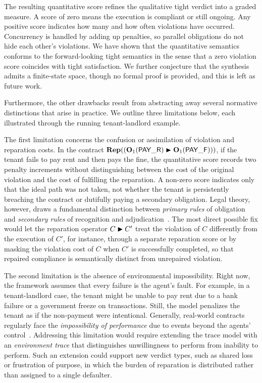 The resulting quantitative score refines the qualitative tight verdict into a graded measure.
A score of zero means the execution is compliant or still ongoing. Any positive score indicates how many and how often violations have occurred.
Concurrency is handled by adding up penalties, so parallel obligations do not hide each other's violations.
We have shown that the quantitative semantics conforms to the forward-looking tight semantics in the sense that a zero violation score coincides with tight satisfaction. We further conjecture that the synthesis admits a finite-state space, though no formal proof is provided, and this is left as future work. 

Furthermore, the other drawbacks result from abstracting away several normative distinctions that arise in practice.
We outline three limitations below, each illustrated through the running tenant-landlord example.

The first limitation concerns the confusion or assimilation of violation and reparation costs.
In the contract $\repit{(\obl[1]{\PAY} \repair \obl[1]{\PAYF})}$, if the tenant fails to pay rent and then pays the fine, the quantitative score records two penalty increments without distinguishing between the cost of the original violation and the cost of fulfilling the reparation.
A non-zero score indicates only that the ideal path was not taken, not whether the tenant is persistently breaching the contract or dutifully paying a secondary obligation.
Legal theory, however, draws a fundamental distinction between \emph{primary rules} of obligation and \emph{secondary rules} of recognition and adjudication~\cite{Hart1961}. The most direct possible fix would let the reparation operator $C \repair C'$ treat the violation of $C$ differently from the execution of $C'$, for instance, through a separate reparation score or by masking the violation cost of $C$ when $C'$ is successfully completed, so that repaired compliance is semantically distinct from unrepaired violation.

The second limitation is the absence of environmental impossibility.
Right now, the framework assumes that every failure is the agent's fault.
For example, in a tenant-landlord case, the tenant might be unable to pay rent due to a bank failure or a government freeze on transactions. Still, the model penalizes the tenant as if the non-payment were intentional. Generally, real-world contracts regularly face the \emph{impossibility of performance} due to events beyond the agents' control~\cite{eisenberg2009impossibility}.
Addressing this limitation would require extending the trace model with an \emph{environment trace} that distinguishes unwillingness to perform from inability to perform.
Such an extension could support new verdict types, such as shared loss or frustration of purpose, in which the burden of reparation is distributed rather than assigned to a single defaulter.

